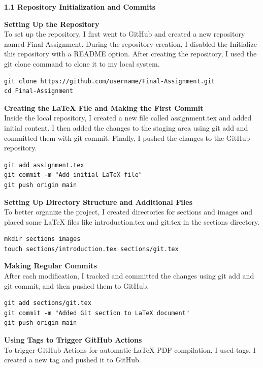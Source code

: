\documentclass{article}
\begin{document}
\textbf{1.1 Repository Initialization and Commits}

\textbf{Setting Up the Repository} \\
To set up the repository, I first went to GitHub and created a new repository named Final-Assignment. During the repository creation, I disabled the Initialize this repository with a README option. After creating the repository, I used the git clone command to clone it to my local system.

\begin{verbatim}
git clone https://github.com/username/Final-Assignment.git
cd Final-Assignment
\end{verbatim}

\textbf{Creating the LaTeX File and Making the First Commit} \\
Inside the local repository, I created a new file called assignment.tex and added initial content. I then added the changes to the staging area using git add and committed them with git commit. Finally, I pushed the changes to the GitHub repository.

\begin{verbatim}
git add assignment.tex
git commit -m "Add initial LaTeX file"
git push origin main
\end{verbatim}
\usepackage{graphicx}
\textbf{Setting Up Directory Structure and Additional Files} \\
To better organize the project, I created directories for sections and images and placed some LaTeX files like introduction.tex and git.tex in the sections directory.

\begin{verbatim}
mkdir sections images
touch sections/introduction.tex sections/git.tex
\end{verbatim}

\textbf{Making Regular Commits} \\
After each modification, I tracked and committed the changes using git add and git commit, and then pushed them to GitHub.

\begin{verbatim}
git add sections/git.tex
git commit -m "Added Git section to LaTeX document"
git push origin main
\end{verbatim}

\textbf{Using Tags to Trigger GitHub Actions} \\
To trigger GitHub Actions for automatic LaTeX PDF compilation, I used tags. I created a new tag and pushed it to GitHub.
\end{document}
